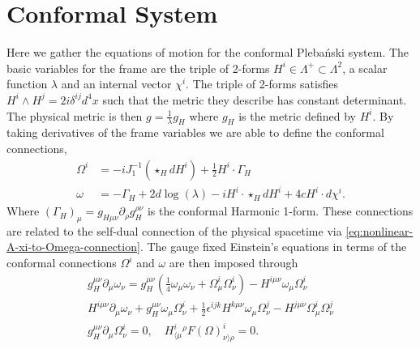 \documentclass[10pt]{report}
\newcommand{\pleb}[0]{Pleba\'nski}
\theoremstyle{definition}
\begin{document}
        \section{Conformal System} \label{sec:nonlin-pleb-conformal-system}
        Here we gather the equations of motion for the conformal \pleb{} system. The basic  variables for the frame are the triple of 2-forms $H^i \in \Lambda^+ \subset \Lambda^2$, a scalar function $\lambda$ and an internal vector $\chi^i$. The triple of 2-forms satisfies $H^i \wedge H^j = 2i\delta^{ij} d^4x$ such that the metric they describe has constant determinant. The physical metric is then $g = \frac{1}{\lambda} g_H$ where $g_H$ is the metric defined by $H^i$. By taking derivatives of the frame variables we are able to define the conformal connections, 
        \begin{equation} \label{eq:nonlinear-conformal-connection-definitions}
            \begin{aligned}
                \Omega^i & = -i J_1^{-1}(\star_H dH^i) + \frac{1}{2} H^i \cdot \Gamma_H \\
                \omega & = -\Gamma_H + 2 d\log(\lambda) - i H^i \cdot \star_H dH^i + 4 c H^i \cdot d\chi^i.
            \end{aligned}
        \end{equation}
        Where $(\Gamma_H)_\mu = g_{H\mu\nu} \partial_\rho g_H^{\rho\nu}$ is the conformal Harmonic 1-form. These connections are related to the self-dual connection of the physical spacetime via \cref{eq:nonlinear-A-xi-to-Omega-connection}. The gauge fixed Einstein's equations in terms of the conformal connections $\Omega^i$ and $\omega$ are then imposed through 
        \begin{equation} \label{eq:nonlinear-conformal-einstens-and-gauge-equations}
            \begin{gathered}
                g_H^{\mu\nu} \partial_\mu \omega_\nu = g_H^{\mu\nu} \left( \frac{1}{4} \omega_\mu \omega_\nu + \Omega^i_\mu \Omega^i_\nu \right) - H^{i\mu\nu} \omega_\mu \Omega^i_\nu \\
                H^{i\mu\nu} \partial_\mu \omega_\nu + g_H^{\mu\nu} \omega_\mu \Omega^i_\nu + \frac{1}{2} \epsilon^{ijk} H^{k\mu\nu} \omega_\mu \Omega^j_\nu - H^{j\mu\nu} \Omega^i_\mu \Omega^j_\nu \\
                g_H^{\mu\nu} \partial_\mu \Omega^i_\nu = 0, \quad H^i_{\langle \mu}{}^\rho F(\Omega)^i_{\nu\rangle \rho} = 0.
            \end{gathered}
        \end{equation}
\end{document}
